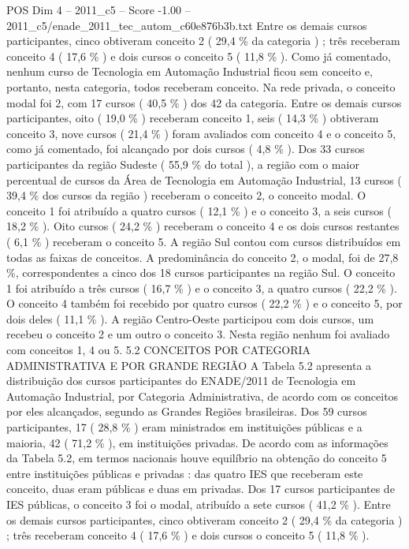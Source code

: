 \begin{textsample}{POS Dim 4 – 2011\_c5 – Score -1.00 – 2011\_c5/enade\_2011\_tec\_autom\_c60e876b3b.txt}
Entre os demais cursos participantes, cinco obtiveram conceito 2 ( 29,4 \% da categoria ) ; três receberam conceito 4 ( 17,6 \% ) e dois cursos o conceito 5 ( 11,8 \% ).
Como já comentado, nenhum curso de Tecnologia em Automação Industrial ficou sem conceito e, portanto, nesta categoria, todos receberam conceito.
Na rede privada, o conceito modal foi 2, com 17 cursos ( 40,5 \% ) dos 42 da categoria.
Entre os demais cursos participantes, oito ( 19,0 \% ) receberam conceito 1, seis ( 14,3 \% ) obtiveram conceito 3, nove cursos ( 21,4 \% ) foram avaliados com conceito 4 e o conceito 5, como já comentado, foi alcançado por dois cursos ( 4,8 \% ).
Dos 33 cursos participantes da região Sudeste ( 55,9 \% do total ), a região com o maior percentual de cursos da Área de Tecnologia em Automação Industrial, 13 cursos ( 39,4 \% dos cursos da região ) receberam o conceito 2, o conceito modal.
O conceito 1 foi atribuído a quatro cursos ( 12,1 \% ) e o conceito 3, a seis cursos ( 18,2 \% ).
Oito cursos ( 24,2 \% ) receberam o conceito 4 e os dois cursos restantes ( 6,1 \% ) receberam o conceito 5.
A região Sul contou com cursos distribuídos em todas as faixas de conceitos.
A predominância do conceito 2, o modal, foi de 27,8 \%, correspondentes a cinco dos 18 cursos participantes na região Sul.
O conceito 1 foi atribuído a três cursos ( 16,7 \% ) e o conceito 3, a quatro cursos ( 22,2 \% ).
O conceito 4 também foi recebido por quatro cursos ( 22,2 \% ) e o conceito 5, por dois deles ( 11,1 \% ).
A região Centro-Oeste participou com dois cursos, um recebeu o conceito 2 e um outro o conceito 3.
Nesta região nenhum foi avaliado com conceitos 1, 4 ou 5. 5.2 CONCEITOS POR CATEGORIA ADMINISTRATIVA E POR GRANDE REGIÃO A Tabela 5.2 apresenta a distribuição dos cursos participantes do ENADE/2011 de Tecnologia em Automação Industrial, por Categoria Administrativa, de acordo com os conceitos por eles alcançados, segundo as Grandes Regiões brasileiras.
Dos 59 cursos participantes, 17 ( 28,8 \% ) eram ministrados em instituições públicas e a maioria, 42 ( 71,2 \% ), em instituições privadas.
De acordo com as informações da Tabela 5.2, em termos nacionais houve equilíbrio na obtenção do conceito 5 entre instituições públicas e privadas : das quatro IES que receberam este conceito, duas eram públicas e duas em privadas.
Dos 17 cursos participantes de IES públicas, o conceito 3 foi o modal, atribuído a sete cursos ( 41,2 \% ).
Entre os demais cursos participantes, cinco obtiveram conceito 2 ( 29,4 \% da categoria ) ; três receberam conceito 4 ( 17,6 \% ) e dois cursos o conceito 5 ( 11,8 \% ).

\end{textsample}
